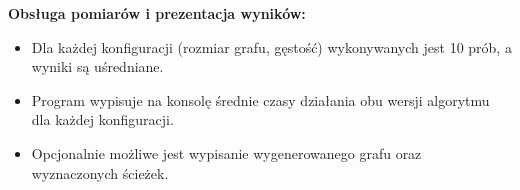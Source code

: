 \documentclass[a4paper,12pt]{article}
\begin{document}
            \vspace{1em}
            \textbf{Obsługa pomiarów i prezentacja wyników:}
            \begin{itemize}
                \item Dla każdej konfiguracji (rozmiar grafu, gęstość) wykonywanych jest 10 prób, a wyniki są uśredniane.
                \item Program wypisuje na konsolę średnie czasy działania obu wersji algorytmu dla każdej konfiguracji.
                \item Opcjonalnie możliwe jest wypisanie wygenerowanego grafu oraz wyznaczonych ścieżek.
            \end{itemize}
            \vspace{1em}
        \newpage
        \vspace*{2em}
\end{document}
